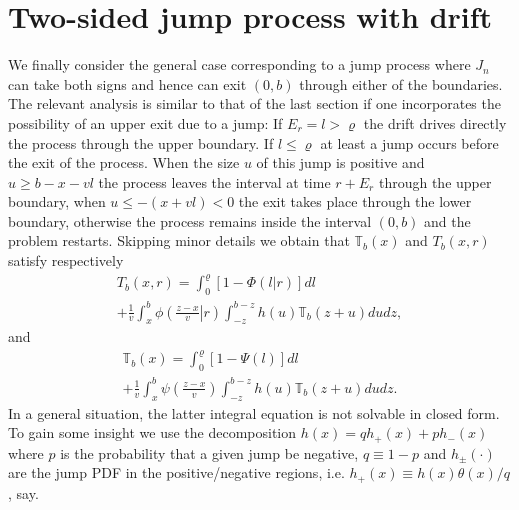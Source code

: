 \documentclass[english,aps,a4paper,twocolumn,showpacs,showkeys,amsfonts,amsmath,amssymb,amscd,nofootinbib]{revtex4}
\newcommand{\1}{\'\i}
\newcommand{\TT}{\mathbb{T}}\newcommand{\FF}{\mathbb{F}}
\begin{document}
\section{\label{S_two-sided}Two-sided jump process with drift}
We finally consider the general case corresponding to a jump
process where $J_n$ can take both signs and hence can    exit
$(0,b)$ through either of the boundaries.   The relevant analysis
is similar to that of the last section if one incorporates  the
possibility of an upper exit due to a jump: If $E_r=l>\varrho$ the drift drives directly the process through the upper boundary. If $l\leqslant \varrho$ at least a jump occurs before the exit of the process. When the size $u$ of this jump is positive and $u\geqslant b-x-vl$ the process leaves the interval at time $r+E_r$ through the upper boundary, when $u\leqslant -(x+vl)<0$ the exit takes place through the lower boundary, otherwise the process remains inside the interval $(0,b)$ and the problem restarts.
Skipping minor details
we obtain that $\TT_b(x)$ and $T_b(x,r)$ satisfy respectively
\begin{eqnarray}
T_b(x,r)=
\int^{\varrho}_{0}\left[1-\Phi\left(l|r\right)\right]d  l \nonumber \\+
\frac{1}{v}\int^{b}_{x}
\phi\left(\left.\frac{z-x}{v}\right|r\right) \int^{b-z}_{-z} h(u)
\TT_b\left(z+u\right)d  ud  z, %
\end{eqnarray}
and
\begin{eqnarray}
\TT_b(x)= \int^{\varrho}_{0}\left[1-\Psi\left(l\right)\right]d
l \nonumber \\+ \frac{1}{v}\int^{b}_{x} \psi\left(\frac{z-x}{v}\right)
\int^{b-z}_{-z} h(u) \TT_b\left(z+u\right)dud  z.  %
\end{eqnarray}
   In  a general situation, the latter integral  equation is not
   solvable  in  closed form. To gain some insight  we use the
    decomposition
$ h(x)= q h_+(x)  + p  h_-(x)$ where $p$ is the probability  that
a given jump be  negative, $q\equiv 1-p$  and
 $h_{\pm}(\cdot)$  are the jump PDF
in the positive/negative regions, i.e.  $h_+(x)\equiv h(x)
\theta(x) \big/ q$, say.
\end{document}
